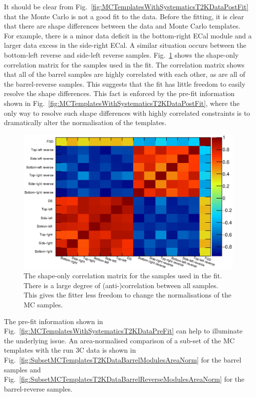 \newline
\newline
It should be clear from Fig.~\ref{fig:MCTemplatesWithSystematicsT2KDataPostFit} that the Monte Carlo is not a good fit to the data.  Before the fitting, it is clear that there are shape differences between the data and Monte Carlo templates.  For example, there is a minor data deficit in the bottom-right ECal module and a larger data excess in the side-right ECal.  A similar situation occurs between the bottom-left reverse and side-left reverse samples.  Fig.~\ref{fig:ShapeCorrelationMatrix} shows the shape-only correlation matrix for the samples used in the fit.  The correlation matrix shows that all of the barrel samples are highly correlated with each other, as are all of the barrel-reverse samples.  This suggests that the fit has little freedom to easily resolve the shape differences.  This fact is enforced by the pre-fit information shown in Fig.~\ref{fig:MCTemplatesWithSystematicsT2KDataPostFit}, where the only way to resolve such shape differences with highly correlated constraints is to dramatically alter the normalisation of the templates. 
\begin{figure}
  \centering
  \includegraphics[width=15cm]{images/measurement/data/ShapeCorrelationMatrix.eps}
  \caption{The shape-only correlation matrix for the samples used in the fit.  There is a large degree of (anti-)correlation between all samples.  This gives the fitter less freedom to change the normalisations of the MC samples.}
  \label{fig:ShapeCorrelationMatrix}
\end{figure}
The pre-fit information shown in Fig.~\ref{fig:MCTemplatesWithSystematicsT2KDataPreFit} can help to illuminate the underlying issue.  An area-normalised comparison of a sub-set of the MC templates with the run 3C data is shown in Fig.~\ref{fig:SubsetMCTemplatesT2KDataBarrelModulesAreaNorm} for the barrel samples and Fig.~\ref{fig:SubsetMCTemplatesT2KDataBarrelReverseModulesAreaNorm} for the barrel-reverse samples.  
